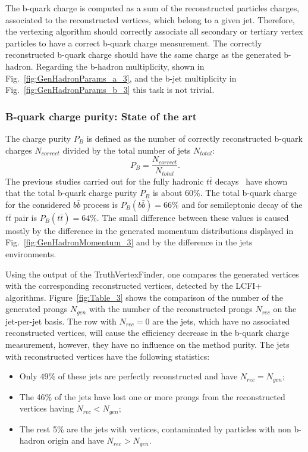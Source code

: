 The b-quark charge is computed as a sum of the reconstructed particles charges, associated to the reconstructed vertices, which belong to a given jet. 
Therefore, the vertexing algorithm should correctly associate all secondary or tertiary vertex particles to have a correct b-quark charge measurement. 
The correctly reconstructed b-quark charge should have the same  charge as the generated b-hadron. 
Regarding the b-hadron multiplicity, shown in Fig.~\ref{fig:GenHadronParams_a_3}, and the b-jet multiplicity in Fig.~\ref{fig:GenHadronParams_b_3} this task is not trivial. 

\subsubsection{B-quark charge purity: State of the art}
The charge purity $P_B$ is defined as the number of correctly reconstructed b-quark charges $N_{correct}$ divided by the total number of jets $N_{total}$:
\begin{equation}
	\label{formula:Purity_3}
	P_B = \frac{N_{correct}}{N_{total}}.
\end{equation} 
The previous studies carried out for the fully hadronic $t\bar{t}$ decays~\cite{Amjad:2014tha} have shown that the total b-quark charge purity $P_B$ is about 60\%.
The total b-quark charge for the considered $b\bar{b}$ process  is $P_B(b\bar{b}) = 66\%$ and for semileptonic decay of the  $t\bar{t}$ pair is $P_B(t\bar{t}) = 64\%$. 
The small difference between these values is caused mostly by the difference in the generated momentum  distributions displayed in Fig.~\ref{fig:GenHadronMomentum_3} and by the difference in the jets environments.

Using the output of the TruthVertexFinder, one compares the generated vertices with the corresponding reconstructed vertices, detected by the LCFI+ algorithms. 
Figure~\ref{fig:Table_3} shows the comparison of the number of the generated prongs $N_{gen}$ with the number of the reconstructed prongs $N_{rec}$ on the jet-per-jet basis. 
The row with $N_{rec} = 0$ are the jets, which have no associated reconstructed vertices, will cause the efficiency decrease in the b-quark charge measurement, however, they have no influence on the method purity.
The jets with reconstructed vertices have the following statistics:
\begin{itemize}
\item Only 49\% of these jets are perfectly reconstructed and have $N_{rec}=N_{gen}$;
\item The 46\% of the jets have lost one or more prongs from the reconstructed vertices having $N_{rec}<N_{gen}$;
\item The rest 5\% are the jets with vertices, contaminated by particles with non b-hadron origin and have $N_{rec}>N_{gen}$.
\end{itemize}


